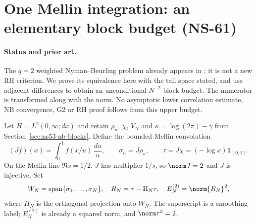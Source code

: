 \section{One Mellin integration: an elementary block budget (NS-61)}
\label{sec:ns61-smoothed-nb}

\paragraph{Status and prior art.}
The $q=2$ weighted Nyman--Beurling problem already appears in
\cite{Ehm2024}; it is not a new RH criterion. We prove its equivalence
here with the tail space stated, and use adjacent differences to obtain
an unconditional $N^{-2}$ block budget. The numerator is transformed
along with the norm. No asymptotic lower correlation estimate, NB
convergence, G2 or RH proof follows from this upper budget.

Let $H=L^2(0,\infty;dx)$ and retain $\rho_n$, $\chi$, $V_N$ and
$\kappa=\log(2\pi)-\gamma$ from Section~\ref{sec:ns53-nb-blocks}.
Define the bounded Mellin convolution
\[
 (Jf)(x)=\int_0^1f(x/u)\,\frac{du}{u},\qquad
 \sigma_n=J\rho_n,\qquad \tau=J\chi=(-\log x)\mathbf1_{(0,1)}.
\]
On the Mellin line $\Re s=1/2$, $J$ has multiplier $1/s$, so
$\norm J=2$ and $J$ is injective. Set
\[
 W_N=\operatorname{span}\{\sigma_1,\ldots,\sigma_N\},\quad
 R_N=\tau-\Pi_N\tau,\quad E_N^{(2)}=\norm{R_N}^2,
\]
where $\Pi_N$ is the orthogonal projection onto $W_N$.
The superscript is a smoothing label; $E_N^{(2)}$ is already a
squared norm, and $\norm\tau^2=2$.

